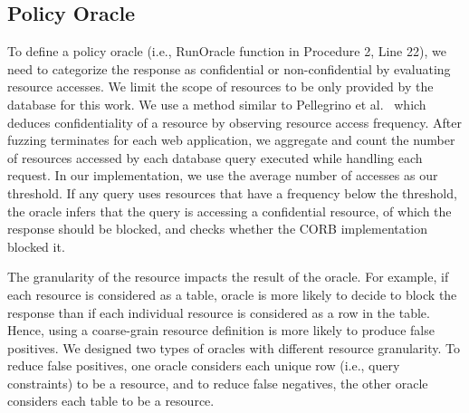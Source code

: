 \documentclass[10pt,conference]{IEEEtran}
\begin{document}
\subsection{Policy Oracle}
To define a policy oracle (i.e., RunOracle function in Procedure 2, Line 22), we need to categorize the response as confidential or non-confidential by evaluating resource accesses. We limit the scope of resources to be only provided by the database for this work. We use a method similar to Pellegrino et al.~\cite{pellegrino2017deemon} which deduces confidentiality of a resource by observing resource access frequency. After fuzzing terminates for each web application, we aggregate and count the number of resources accessed by each database query executed while handling each request. In our implementation, we use the average number of accesses as our threshold. If any query uses resources that have a frequency below the threshold, the oracle infers that the query is accessing a confidential resource, of which the response should be blocked, and checks whether the CORB implementation blocked it. 

The granularity of the resource impacts the result of the oracle. For example, if each resource is considered as a table, oracle is more likely to decide to block the response than if each individual resource is considered as a row in the table. Hence, using a coarse-grain resource definition is more likely to produce false positives. We designed two types of oracles with different resource granularity. To reduce false positives, one oracle considers each unique row (i.e., query constraints) to be a resource, and to reduce false negatives, the other oracle considers each table to be a resource.    





\end{document}
